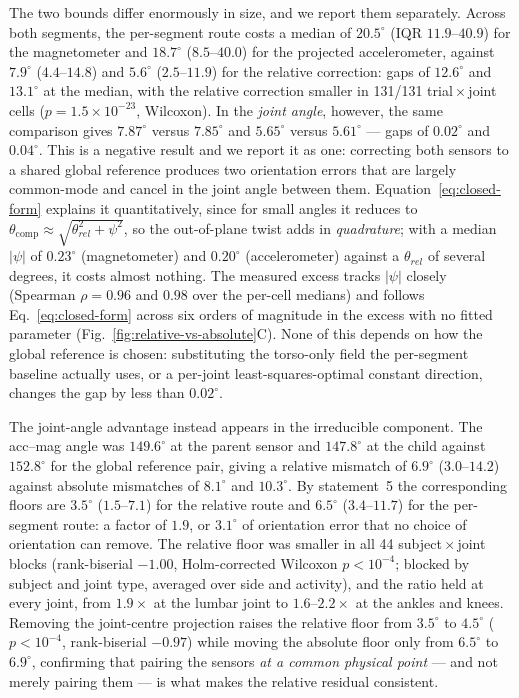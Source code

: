 The two bounds differ enormously in size, and we report them separately. Across both segments,
the per-segment route costs a median of $20.5^\circ$ ($\mathrm{IQR}$ $11.9$--$40.9$) for the
magnetometer and $18.7^\circ$ ($8.5$--$40.0$) for the projected accelerometer, against
$7.9^\circ$ ($4.4$--$14.8$) and $5.6^\circ$ ($2.5$--$11.9$) for the relative correction: gaps of
$12.6^\circ$ and $13.1^\circ$ at the median, with the relative correction smaller in 131/131
trial\,$\times$\,joint cells ($p = 1.5\times10^{-23}$, Wilcoxon). In the \emph{joint angle},
however, the same comparison gives $7.87^\circ$ versus $7.85^\circ$ and $5.65^\circ$ versus
$5.61^\circ$ --- gaps of $0.02^\circ$ and $0.04^\circ$. This is a negative result and we report
it as one: correcting both sensors to a shared global reference produces two orientation errors
that are largely common-mode and cancel in the joint angle between them.
Equation~\eqref{eq:closed-form} explains it quantitatively, since for small angles it reduces to
$\theta_{\mathrm{comp}} \approx \sqrt{\theta_{rel}^2 + \psi^2}$, so the out-of-plane twist adds
in \emph{quadrature}; with a median $|\psi|$ of $0.23^\circ$ (magnetometer) and $0.20^\circ$
(accelerometer) against a $\theta_{rel}$ of several degrees, it costs almost nothing. The
measured excess tracks $|\psi|$ closely (Spearman $\rho = 0.96$ and $0.98$ over the per-cell
medians) and follows Eq.~\eqref{eq:closed-form} across six orders of magnitude in the excess
with no fitted parameter (Fig.~\ref{fig:relative-vs-absolute}C). None of this depends on how the global
reference is chosen: substituting the torso-only field the per-segment baseline actually uses,
or a per-joint least-squares-optimal constant direction, changes the gap by less than
$0.02^\circ$.

The joint-angle advantage instead appears in the irreducible component. The acc--mag angle was
$149.6^\circ$ at the parent sensor and $147.8^\circ$ at the child against $152.8^\circ$ for the
global reference pair, giving a relative mismatch of $6.9^\circ$ ($3.0$--$14.2$) against absolute
mismatches of $8.1^\circ$ and $10.3^\circ$. By statement~5 the corresponding floors are
$3.5^\circ$ ($1.5$--$7.1$) for the relative route and $6.5^\circ$ ($3.4$--$11.7$) for the
per-segment route: a factor of $1.9$, or $3.1^\circ$ of orientation error that no choice of
orientation can remove. The relative floor was smaller in all 44 subject\,$\times$\,joint blocks
(rank-biserial $-1.00$, Holm-corrected Wilcoxon $p < 10^{-4}$; blocked by subject and joint type,
averaged over side and activity), and the ratio held at every joint, from $1.9\times$ at the
lumbar joint to $1.6$--$2.2\times$ at the ankles and knees. Removing the joint-centre projection
raises the relative floor from $3.5^\circ$ to $4.5^\circ$ ($p < 10^{-4}$, rank-biserial $-0.97$)
while moving the absolute floor only from $6.5^\circ$ to $6.9^\circ$, confirming that pairing the
sensors \emph{at a common physical point} --- and not merely pairing them --- is what makes the
relative residual consistent.

